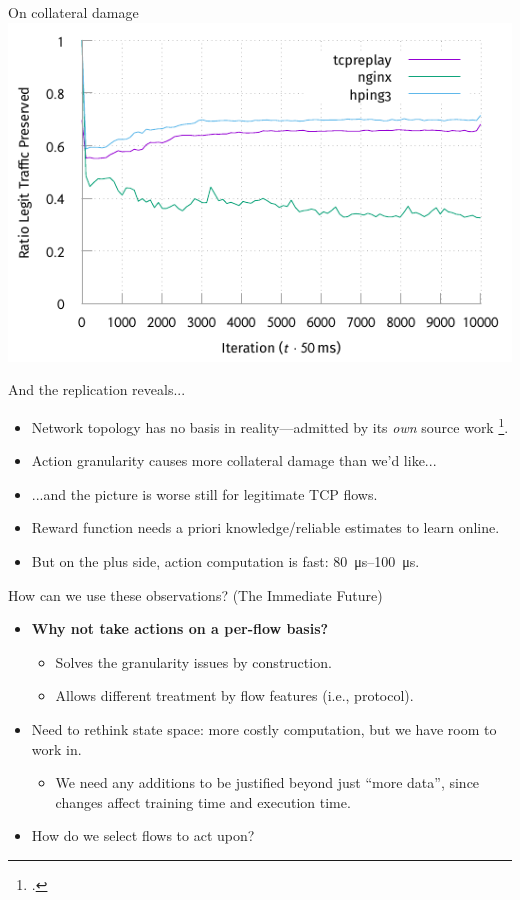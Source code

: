 \documentclass[aspectratio=169,xcolor={dvipsnames}
,hide notes
]{beamer}
\begin{document}
\begin{frame}{On collateral damage}
\centering
\includegraphics[width=0.8\linewidth]{../plots/online-varyN-nginx-pres.pdf}
\end{frame}

\begin{frame}{And the replication reveals...}	
\begin{itemize}
	\item Network topology has no basis in reality---admitted by its \emph{own} source work \footcite{DBLP:journals/ccr/MahajanBFIPS02a}.
	
	\item Action granularity causes more collateral damage than we'd like...
	
	\item ...and the picture is worse still for legitimate TCP flows.
	
	\item Reward function needs a priori knowledge/reliable estimates to learn online.
	
	\item \alert{But on the plus side, action computation is fast: \SIrange{80}{100}{\micro\second}.}
\end{itemize}
\end{frame}

\begin{frame}{How can we use these observations? (The Immediate Future)}
\begin{itemize}
	\item \textbf{\alert{Why not take actions on a per-flow basis?}}
	\begin{itemize}
		\item Solves the granularity issues by construction.
		\item Allows different treatment by flow features (i.e., protocol).
	\end{itemize}
	\item Need to rethink state space: more costly computation, but we have room to work in.
	\begin{itemize}
		\item We need any additions to be justified beyond just ``more data'', since \alert{changes affect training time and execution time}.
	\end{itemize}
	\item How do we select flows to act upon?
\end{itemize}
\end{frame}
\end{document}
